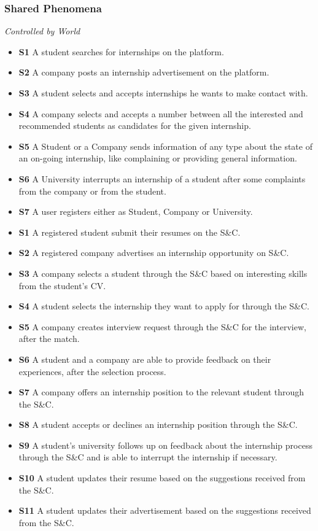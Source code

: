 \documentclass{article}
\begin{document}
\subsubsection{Shared Phenomena}
    \textit{Controlled by World}
    \begin{itemize}
        \item \textbf{S1} A student searches for internships on the platform.
        \item \textbf{S2} A company posts an internship advertisement on the platform.
        \item \textbf{S3} A student selects and accepts internships he wants to make contact with.
        \item \textbf{S4} A company selects and accepts a number between all the interested and recommended students as candidates for the given internship.
        \item \textbf{S5} A Student or a Company sends information of any type about the state of an on-going internship, like complaining or providing general information.
        \item \textbf{S6} A University interrupts an internship of a student after some complaints from the company or from the student. 
        \item \textbf{S7} A user registers either as Student, Company or University.
        
        \item \textbf{S1} A registered student submit their resumes on the S\&C.
        \item \textbf{S2} A registered company advertises an internship opportunity on S\&C.
        \item \textbf{S3} A company selects a student through the S\&C based on interesting skills from the student's CV. 
        \item \textbf{S4} A student selects the internship they want to apply for through the S\&C.
        \item \textbf{S5} A company creates interview request through the S\&C for the interview, after the match.
        \item \textbf{S6} A student and a company are able to provide feedback on their experiences, after the selection process.
        \item \textbf{S7} A company offers an internship position to the relevant student through the S\&C.
        \item \textbf{S8} A student accepts or declines an internship position through the S\&C.
        \item \textbf{S9} A student's university follows up on feedback about the internship process through the S\&C and is able to interrupt the internship if necessary.
        \item \textbf{S10} A student updates their resume based on the suggestions received from the S\&C.
        \item \textbf{S11} A student updates their advertisement based on the suggestions received from the S\&C.
    \end{itemize}
\end{document}
